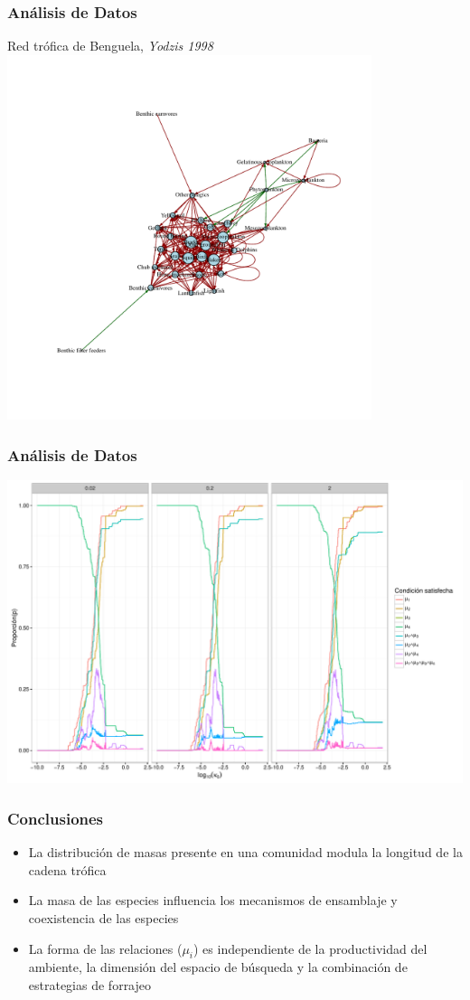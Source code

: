 \documentclass[11 pt,t]{beamer}
\begin{document}
\begin{frame}
  \frametitle{An\'alisis de Datos}
  Red tr\'ofica de Benguela, \textit{Yodzis 1998}
  \centering
  \includegraphics[width = 0.8\textwidth]{../manuscript/Plots/Benguela.pdf}
\end{frame}
\begin{frame}
  \frametitle{An\'alisis de Datos}
  \centering
  \includegraphics[width = \textwidth]{../manuscript/Plots/DataAna.pdf}
\end{frame}
\begin{frame}
  \frametitle{Conclusiones}
    \Large
  \begin{itemize}
  \item La distribuci\'on de masas presente en una comunidad modula la longitud de la cadena tr\'ofica
  \item La masa de las especies influencia los mecanismos de ensamblaje y coexistencia de las especies
  \item La forma de las relaciones ($\mu_i$) es independiente de la productividad del ambiente, la dimensi\'on del espacio de b\'usqueda y la combinaci\'on de estrategias de forrajeo
  \end{itemize}
\end{frame}
\end{document}
